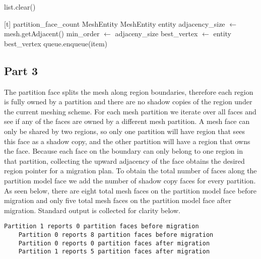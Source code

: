 \documentclass{article}
\begin{document}
\begin{algorithm}
\begin{algorithmic}

            \State {}
            \State list.clear()

        \EndIf

    \EndWhile
\EndProcedure
\State

[t]
    \State partition\_face\_count
    \State MeshEntity
    \State MeshEntity entity
            \State adjacency\_size $\gets$ mesh.getAdjacent()
                \State min\_order $\gets$ adjaceny\_size
                \State best\_vertex $\gets$ entity
            \EndIf
        \EndIf
    \EndWhile
    \State\Return best\_vertex
\EndProcedure
\State
{}
            \State queue.enqueue(item)
        \EndIf
    \EndFor
\EndProcedure

\end{algorithmic}
\end{algorithm}

\FloatBarrier
\restoregeometry


\subsection{Part 3}
The partition face splits the mesh along region boundaries, therefore each region is fully owned by a partition and there are no shadow copies of the region under the current meshing scheme. For each mesh partition we iterate over all faces and see if any of the faces are owned by a different mesh partition. A mesh face can only be shared by two regions, so only one partition will have region that sees this face as a shadow copy, and the other partition will have a region that owns the face. Because each face on the boundary can only belong to one region in that partition, collecting the upward adjacency of the face obtains the desired region pointer for a migration plan. To obtain the total number of faces along the partition model face we add the number of shadow copy faces for every partition. As seen below, there are eight total mesh faces on the partition model face before migration and only five total mesh faces on the partition model face after migration. Standard output is collected for clarity below.
\begin{lstlisting}[frame = single]
    Partition 1 reports 0 partition faces before migration
    Partition 0 reports 8 partition faces before migration
    Partition 0 reports 0 partition faces after migration
    Partition 1 reports 5 partition faces after migration
\end{lstlisting}
\end{document}
